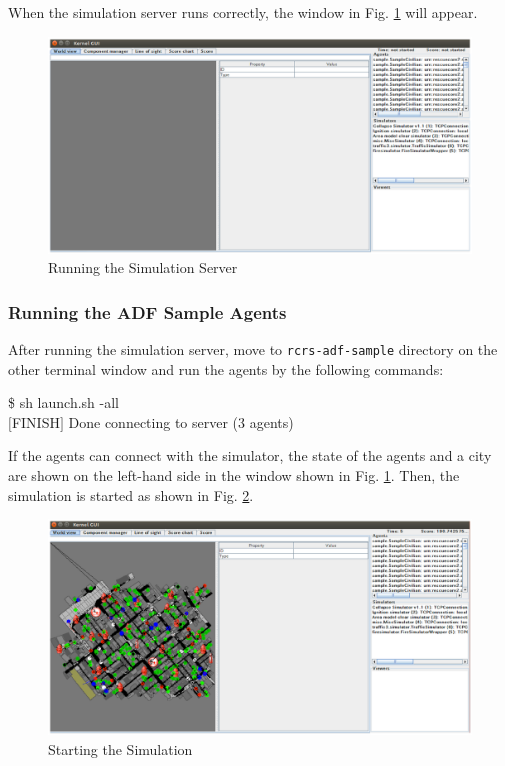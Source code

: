 \documentclass{article}
\begin{document}
When the simulation server runs correctly, the window in Fig. \ref{fig:simulator01} will appear.

\begin{figure}[ht]
 \begin{center}
  \includegraphics[width=.9\linewidth]{figs/simulator01.eps}
  \caption{Running the Simulation Server}
  \label{fig:simulator01}
 \end{center}
\end{figure}
\subsubsection{Running the ADF Sample Agents}
After running the simulation server, move to \texttt{rcrs-adf-sample} directory on the other terminal window and run the agents by the following commands:

\begin{center}
   \begin{tcolorbox}[title=Running Sample Agents, width=.98\linewidth]
    {\ttfamily
    \$ sh launch.sh -all\\
    $[$FINISH$]$ Done connecting to server (3 agents)
    }
  \end{tcolorbox}
\end{center}

If the agents can connect with the simulator, the state of the agents and a city are shown on the left-hand side in the window shown in Fig. \ref{fig:simulator01}. Then, the simulation is started as shown in Fig. \ref{fig:simulator02}.

\begin{figure}[ht]
 \begin{center}
  \includegraphics[width=1.0\linewidth]{figs/simulator02.eps}
  \caption{Starting the Simulation}
  \label{fig:simulator02}
 \end{center}
\end{figure}
\end{document}
